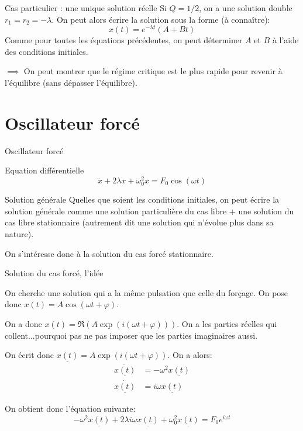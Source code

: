\documentclass{beamer}
\begin{document}
    \begin{frame}{Cas particulier : une unique solution réelle}
        Si $Q = 1/2$, on a une solution double $r_1 = r_2 = -\lambda$. On peut alors écrire la solution sous la forme (à connaître):
        \begin{equation}
            x(t) = e^{-\lambda t} \left(A + B t\right)
        \end{equation}
        Comme pour toutes les équations précédentes, on peut déterminer $A$ et $B$ à l'aide des conditions initiales.

        $\implies$ On peut montrer que le régime critique est le plus rapide pour revenir à l'équilibre (sans dépasser l'équilibre).
    \end{frame}

\section*{Oscillateur forcé}
\begin{frame}{Oscillateur forcé}
    \begin{block}{Equation différentielle}
        \begin{equation}
            \ddot{x} + 2\lambda \dot{x} + \omega_0^2 x = F_0 \cos(\omega t)
        \end{equation}
    \end{block}
    \begin{block}{Solution générale}
        Quelles que soient les conditions initiales, on peut écrire la solution générale comme une solution particulière du cas libre + une solution du cas libre stationnaire (autrement dit une solution qui n'évolue plus dans sa nature).

        On s'intéresse donc à la solution du cas forcé stationnaire. 
    \end{block}
    
\end{frame}
\begin{frame}{Solution du cas forcé, l'idée}

        On cherche une solution qui a la même pulsation que celle du forçage. On pose donc $x(t) = A \cos(\omega t + \varphi)$.

        On a donc $x(t) = \mathfrak{R}(A\exp(i(\omega t+\varphi)))$. On a les parties réelles qui collent...pourquoi pas ne pas imposer que les parties imaginaires aussi. 

        On écrit donc $\underline{x(t)} = A \exp(i(\omega t + \varphi))$. On a alors:\begin{align}
             \underline{\ddot{x(t)}} &= -\omega^2 \underline{x(t)} \\
            \underline{\dot{x(t)}} &= i\omega \underline{x(t)}
        \end{align}

        On obtient donc l'équation suivante:
        \begin{equation}
            -\omega^2 \underline{x(t)} + 2\lambda i \omega \underline{x(t)} + \omega_0^2 \underline{x(t)} = F_0 e^{i\omega t}
        \end{equation}
    
\end{frame}
\end{document}
